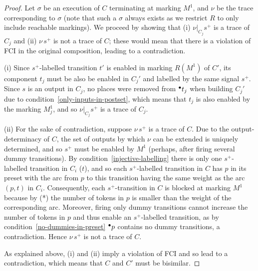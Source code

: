 \begin{proof}
Let $\sigma$ be an execution of $C$ terminating at marking $M^1$,
and $\nu$ be the trace corresponding to $\sigma$ (note that
such a $\sigma$ always exists as we restrict $R$ to only include reachable markings).
We proceed by showing that (i)
$\nu|_{C_j}s^+$ is a trace of $C_j$ and (ii) $\nu\, s^+$ is not
a trace of $C$; these would mean that there is a violation of
FCI in the original composition, leading to a contradiction.

(i) Since $s^+$-labelled transition $t'$ is enabled in marking $R(M^1)$ of $C'$, 
its component $t_j$ must be also be enabled in $C_j'$ and labelled by the same signal $s^+$.
Since $s$ is an output in $C_j$, no places were removed from ${}^\bullet {t_j}$ when building
$C_j'$ due to condition~\ref{only-inputs-in-postset}, which
means that $t_j$ is also enabled by the marking $M^1_j$, and so $\nu|_{C_j}s^+$
is a trace of $C_j$.

(ii) For the sake of contradiction, suppose $\nu\,s^+$ is a
trace of $C$. Due to the output-determinacy of $C$, the set of
outputs by which $\nu$ can be extended is uniquely determined,
and so $s^+$ must be enabled by $M^1$ (perhaps, after firing
several dummy transitions). By
condition~\ref{injective-labelling} there is only one
$s^+$-labelled transition in $C_i$ (\viz $t$), and so each
$s^+$-labelled transition in $C$ has $p$ in its preset with the
arc from $p$ to this transition having the same weight as the
arc $(p,t)$ in $C_i$. Consequently, each $s^+$-transition in
$C$ is blocked at marking $M^1$ because by (*) the number of tokens
in $p$ is smaller than the weight of the corresponding arc.
Moreover, firing only dummy transitions cannot increase the
number of tokens in $p$ and thus enable an $s^+$-labelled
transition, as by condition~\ref{no-dummies-in-preset}
${}^\bullet {p}$ contains no dummy transitions, a contradiction. Hence
$\nu\,s^+$ is not a trace of $C$.

As explained above, (i) and (ii) imply a violation of FCI and
so lead to a contradiction, which means that $C$ and
$C'$ must be bisimilar.
\end{proof}

